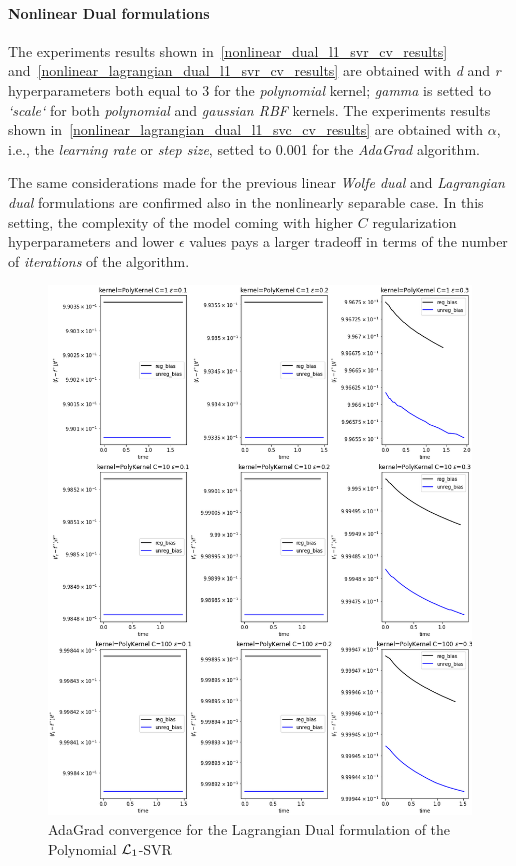 \paragraph{Nonlinear Dual formulations}

The experiments results shown in~\ref{nonlinear_dual_l1_svr_cv_results} and~\ref{nonlinear_lagrangian_dual_l1_svr_cv_results} are obtained with \emph{d} and \emph{r} hyperparameters both equal to 3 for the \emph{polynomial} kernel; \emph{gamma} is setted to \emph{`scale`} for both \emph{polynomial} and \emph{gaussian RBF} kernels. The experiments results shown in~\ref{nonlinear_lagrangian_dual_l1_svc_cv_results} are obtained with $\alpha$, i.e., the \emph{learning rate} or \emph{step size}, setted to 0.001 for the \emph{AdaGrad} algorithm.





The same considerations made for the previous linear \emph{Wolfe dual} and \emph{Lagrangian dual} formulations are confirmed also in the nonlinearly separable case. In this setting, the complexity of the model coming with higher $C$ regularization hyperparameters and lower $\epsilon$ values pays a larger tradeoff in terms of the number of \emph{iterations} of the algorithm.

\begin{figure}[H]
	\centering
	\includegraphics[scale=0.55]{img/poly_lagrangian_dual_l1_svr_loss_history}
	\caption{AdaGrad convergence for the Lagrangian Dual formulation of the Polynomial $\protect \mathcal{L}_1$-SVR}
	\label{fig:poly_lagrangian_dual_l1_svr_loss_history}
\end{figure}

